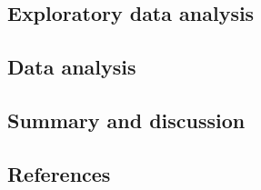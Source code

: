 \documentclass[]{article}
\begin{document}
\hypertarget{exploratory-data-analysis}{%
\subsection{Exploratory data analysis}\label{exploratory-data-analysis}}

\hypertarget{data-analysis}{%
\subsection{Data analysis}\label{data-analysis}}

\hypertarget{summary-and-discussion}{%
\subsection{Summary and discussion}\label{summary-and-discussion}}

\hypertarget{references}{%
\subsection{References}\label{references}}
\end{document}
